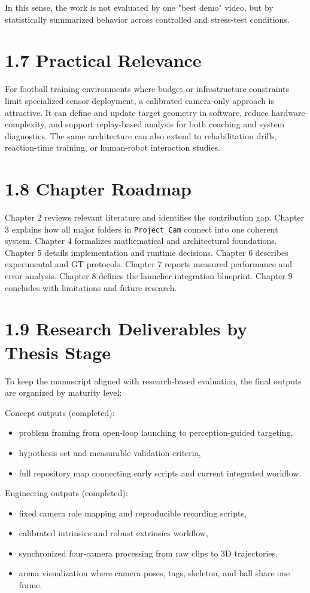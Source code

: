 In this sense, the work is not evaluated by one "best demo" video, but by statistically summarized behavior across controlled and stress-test conditions.

\section{1.7 Practical Relevance}
For football training environments where budget or infrastructure constraints limit specialized sensor deployment, a calibrated camera-only approach is attractive. It can define and update target geometry in software, reduce hardware complexity, and support replay-based analysis for both coaching and system diagnostics. The same architecture can also extend to rehabilitation drills, reaction-time training, or human-robot interaction studies.

\section{1.8 Chapter Roadmap}
Chapter 2 reviews relevant literature and identifies the contribution gap. Chapter 3 explains how all major folders in \texttt{Project\_Cam} connect into one coherent system. Chapter 4 formalizes mathematical and architectural foundations. Chapter 5 details implementation and runtime decisions. Chapter 6 describes experimental and GT protocols. Chapter 7 reports measured performance and error analysis. Chapter 8 defines the launcher integration blueprint. Chapter 9 concludes with limitations and future research.


\section{1.9 Research Deliverables by Thesis Stage}
To keep the manuscript aligned with research-based evaluation, the final outputs are organized by maturity level:

Concept outputs (completed):
\begin{itemize}
  \item problem framing from open-loop launching to perception-guided targeting,
  \item hypothesis set and measurable validation criteria,
  \item full repository map connecting early scripts and current integrated workflow.
\end{itemize}

Engineering outputs (completed):
\begin{itemize}
  \item fixed camera role mapping and reproducible recording scripts,
  \item calibrated intrinsics and robust extrinsics workflow,
  \item synchronized four-camera processing from raw clips to 3D trajectories,
  \item arena visualization where camera poses, tags, skeleton, and ball share one frame.
\end{itemize}

